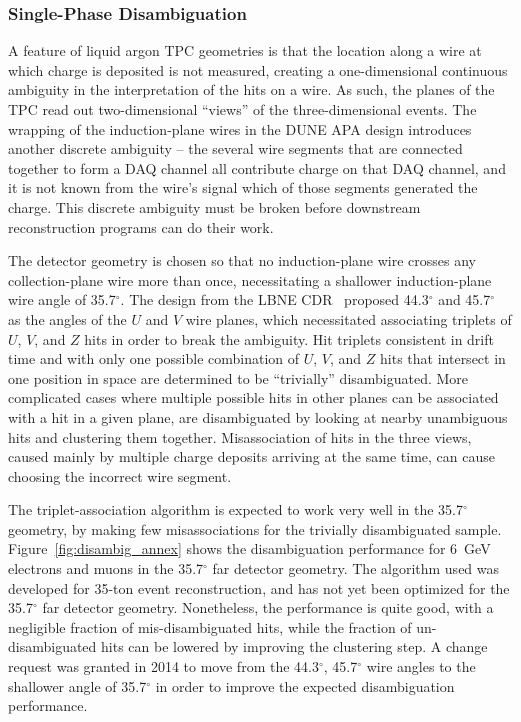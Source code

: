 \subsubsection{Single-Phase Disambiguation}

A feature of liquid argon TPC geometries is that the location along a
wire at which charge is deposited is not measured, creating a
one-dimensional continuous ambiguity in the interpretation of the hits
on a wire.  As such, the planes of the TPC read out two-dimensional
``views'' of the three-dimensional events.  The wrapping of the
induction-plane wires in the DUNE APA design introduces another
discrete ambiguity -- the several wire segments that are connected
together to form a DAQ channel all contribute charge on that DAQ
channel, and it is not known from the wire's signal which of those
segments generated the charge.  This discrete ambiguity must be broken
before downstream reconstruction programs can do their work.

The detector geometry is chosen so that no induction-plane wire
crosses any collection-plane wire more than once, necessitating a
shallower induction-plane wire angle of 35.7$^\circ$.  The design from
the LBNE CDR~\cite{lbnecdr} proposed 44.3$^\circ$ and 45.7$^\circ$ as
the angles of the $U$ and $V$ wire planes, which necessitated
associating triplets of $U$, $V$, and $Z$ hits in order to break the
ambiguity.  Hit triplets consistent in drift time and with only one
possible combination of $U$, $V$, and $Z$ hits that intersect in one
position in space are determined to be ``trivially'' disambiguated.
More complicated cases where multiple possible hits in other planes
can be associated with a hit in a given plane, are disambiguated by
looking at nearby unambiguous hits and clustering them together.
Misassociation of hits in the three views, caused mainly by multiple
charge deposits arriving at the same time, can cause choosing the
incorrect wire segment.

The triplet-association algorithm is expected to work very well in the
35.7$^\circ$ geometry, by making few misassociations for the trivially
disambiguated sample.  Figure~\ref{fig:disambig_annex} shows the
disambiguation performance for 6~GeV electrons and muons in the
35.7$^\circ$ far detector geometry.  The algorithm used was developed for 35-ton event
reconstruction, and has not yet been optimized for the 35.7$^\circ$ far detector geometry.
Nonetheless, the performance is quite good, with a negligible fraction of mis-disambiguated hits,
while the fraction of un-disambiguated hits can be lowered by improving the clustering step.
A change request was granted in 2014 to
move from the 44.3$^\circ$, 45.7$^\circ$ wire angles to the shallower angle
of 35.7$^\circ$ in order to improve the expected disambiguation performance.

